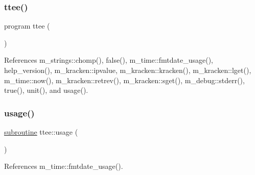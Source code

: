 \mbox{\label{ttee_8f90_aee7d8fff0d52c9b2adc07bda770aa84c}} 
\subsubsection{\texorpdfstring{ttee()}{ttee()}}
{\footnotesize\ttfamily program ttee (\begin{DoxyParamCaption}{ }\end{DoxyParamCaption})}



References m\+\_\+strings\+::chomp(), false(), m\+\_\+time\+::fmtdate\+\_\+usage(), help\+\_\+version(), m\+\_\+kracken\+::ipvalue, m\+\_\+kracken\+::kracken(), m\+\_\+kracken\+::lget(), m\+\_\+time\+::now(), m\+\_\+kracken\+::retrev(), m\+\_\+kracken\+::sget(), m\+\_\+debug\+::stderr(), true(), unit(), and usage().

\mbox{\label{ttee_8f90_a39e87a9f7d8f8fd9a22b457c12d7619a}} 
\subsubsection{\texorpdfstring{usage()}{usage()}}
{\footnotesize\ttfamily \hyperlink{M__stopwatch_83_8txt_acfbcff50169d691ff02d4a123ed70482}{subroutine} ttee\+::usage (\begin{DoxyParamCaption}{ }\end{DoxyParamCaption})}



References m\+\_\+time\+::fmtdate\+\_\+usage().

